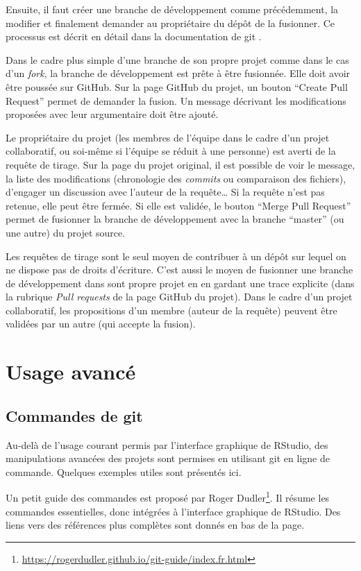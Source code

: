 \documentclass[
  12pt,
  french,
  a4paper,
  extrafontsizes,onecolumn,openright
  ]{memoir}
\newlength{\rf}
\begin{document}
Ensuite, il faut créer une branche de développement comme précédemment, la modifier et finalement demander au propriétaire du dépôt de la fusionner.
Ce processus est décrit en détail dans la documentation de git .

Dans le cadre plus simple d'une branche de son propre projet comme dans le cas d'un \emph{fork}, la branche de développement est prête à être fusionnée.
Elle doit avoir être poussée sur GitHub.
Sur la page GitHub du projet, un bouton \enquote{Create Pull Request} permet de demander la fusion.
Un message décrivant les modifications proposées avec leur argumentaire doit être ajouté.

Le propriétaire du projet (les membres de l'équipe dans le cadre d'un projet collaboratif, ou soi-même si l'équipe se réduit à une personne) est averti de la requête de tirage.
Sur la page du projet original, il est possible de voir le message, la liste des modifications (chronologie des \emph{commits} ou comparaison des fichiers), d'engager un discussion avec l'auteur de la requête\ldots{}
Si la requête n'est pas retenue, elle peut être fermée.
Si elle est validée, le bouton \enquote{Merge Pull Request} permet de fusionner la branche de développement avec la branche \enquote{master} (ou une autre) du projet source.

Les requêtes de tirage sont le seul moyen de contribuer à un dépôt sur lequel on ne dispose pas de droits d'écriture.
C'est aussi le moyen de fusionner une branche de développement dans sont propre projet en en gardant une trace explicite (dans la rubrique \emph{Pull requests} de la page GitHub du projet).
Dans le cadre d'un projet collaboratif, les propositions d'un membre (auteur de la requête) peuvent être validées par un autre (qui accepte la fusion).

\section{Usage avancé}\label{usage-avancuxe9}

\subsection{Commandes de git}\label{commandes-de-git}

Au-delà de l'usage courant permis par l'interface graphique de RStudio, des manipulations avancées des projets sont permises en utilisant git en ligne de commande.
Quelques exemples utiles sont présentés ici.

Un petit guide des commandes est proposé par Roger Dudler\footnote{\url{https://rogerdudler.github.io/git-guide/index.fr.html}}.
Il résume les commandes essentielles, donc intégrées à l'interface graphique de RStudio.
Des liens vers des références plus complètes sont donnés en bas de la page.
\end{document}
